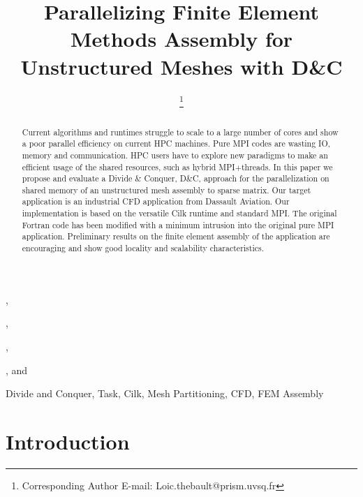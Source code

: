 \documentclass{IOS-Book-Article}
\begin{document}
\begin{frontmatter}              %

\title{Parallelizing Finite Element Methods Assembly for Unstructured Meshes with D\&C}

\author[A]{ %
\thanks{Corresponding Author E-mail: Loic.thebault@prism.uvsq.fr}},
\author[A]{ },
\author[D]{ },
\author[B]{ },
and
\author[A,D]{ }

\address[A]{PRISM - University of Versailles, France}
\address[B]{Dassault Aviation, Saint-Cloud, France}
\address[D]{Exascale Computing Research, France}

\begin{abstract}
Current algorithms and runtimes struggle to scale to a large number of cores and show a poor parallel efficiency on current HPC machines.
Pure MPI codes are wasting IO, memory and communication. HPC users have to explore new paradigms to make an efficient usage of the shared resources,
such as hybrid MPI+threads.
In this paper we propose and evaluate a Divide \& Conquer, D\&C, approach for the parallelization on shared memory of an unstructured mesh assembly to sparse matrix.
Our target application is an industrial CFD application from Dassault Aviation.
Our implementation is based on the versatile Cilk runtime and standard MPI.
The original Fortran code has been modified with a minimum intrusion into the original pure MPI application.
Preliminary results on the finite element assembly of the application are encouraging and show good locality and scalability characteristics.
\end{abstract}

\begin{keyword}
Divide and Conquer, Task, Cilk, Mesh Partitioning, CFD, FEM Assembly
\end{keyword}
\end{frontmatter}

\thispagestyle{empty}
\pagestyle{empty}

\section{Introduction}
\end{document}
